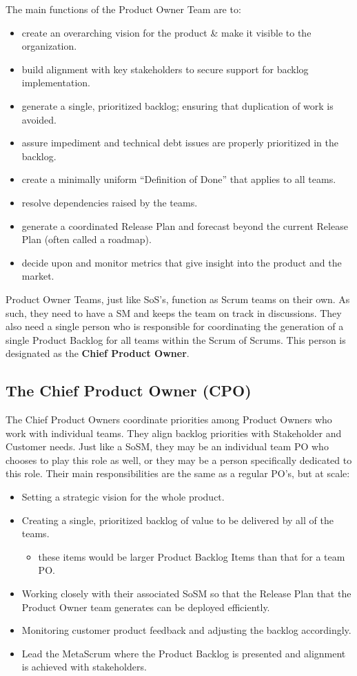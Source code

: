 \documentclass[12pt,a4paper,parskip=full]{scrartcl}
\begin{document}
The main functions of the Product Owner Team are to:
\begin{itemize}
\item create an overarching vision for the product \& make it visible to
the organization.
\item build alignment with key stakeholders to secure support for backlog
implementation.
\item generate a single, prioritized backlog; ensuring that duplication of
work is avoided.
\item assure impediment and technical debt issues are properly prioritized in the backlog.
\item create a minimally uniform ``Definition of Done'' that applies to all teams.
\item resolve dependencies raised by the teams.
\item generate a coordinated Release Plan and forecast beyond the current Release Plan (often called a roadmap).
\item decide upon and monitor metrics that give insight into the product and the market.
\end{itemize}
Product Owner Teams, just like SoS's, function as Scrum teams on their own. As such,
they need to have a SM and keeps the team on track in
discussions. They also need a single person who is responsible for coordinating the
generation of a single Product Backlog for all teams within the Scrum of Scrums.
This person is designated as the \textbf{Chief Product Owner}.

\subsection{The Chief Product Owner (CPO)}
The Chief Product Owners coordinate priorities among
Product Owners who work with individual teams. They align backlog
priorities with Stakeholder and Customer needs. Just like a SoSM, they may
be an individual team PO who chooses to play this role as well, or they may
be a person specifically dedicated to this role. Their main
responsibilities are the same as a regular PO's, but at scale:
\begin{itemize}
\item Setting a strategic vision for the whole product.
\item Creating a single, prioritized backlog of value to be delivered by
all of the teams.
\begin{itemize}
\item these items would be larger Product Backlog Items than that for a team PO.
\end{itemize}
\item Working closely with their associated SoSM so that the Release Plan
that the Product Owner team generates can be deployed efficiently.
\item Monitoring customer product feedback and adjusting the backlog
accordingly.
\item Lead the MetaScrum where the Product Backlog is presented and alignment is achieved with stakeholders.
\end{itemize}
\end{document}
